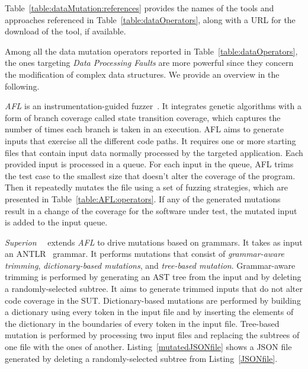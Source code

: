 Table~\ref{table:dataMutation:references} provides the names of the tools and approaches referenced in Table~\ref{table:dataOperators}, along with a URL for the download of the tool, if available.





Among all the data mutation operators reported in Table~\ref{table:dataOperators}, the ones targeting \emph{Data Processing Faults} are more powerful since they concern the modification of complex data structures. %
We provide an overview in the following.




\emph{AFL} is an instrumentation-guided fuzzer~\cite{gutmann2016fuzzing}. It integrates genetic algorithms with a form of branch coverage called state transition coverage,
which captures the number of times each branch is taken in an execution. 
AFL aims to generate inputs that exercise all the different code paths.
It requires one or more starting files that contain input data normally processed by the targeted application. 
Each provided input is processed in a queue. For each input in the queue, AFL trims the test case to the smallest size that doesn't alter the coverage of the program. Then it repeatedly mutates the file using a set of fuzzing strategies, which are presented in Table~\ref{table:AFL:operators}.
If any of the generated mutations result in a change of the coverage for the software under test, the mutated input is added to the input queue.



\emph{Superion}~\Superion~ extends \emph{AFL} to drive mutations based on grammars. It takes as input an ANTLR~\cite{ANTLR} grammar. 
It performs mutations that consist of \emph{grammar-aware trimming}, \emph{dictionary-based mutations}, and \emph{tree-based mutation}.
Grammar-aware trimming is performed by generating an AST tree from the input and by deleting a randomly-selected subtree. 
It aims to generate trimmed inputs that do not alter code coverage in the SUT.
Dictionary-based mutations are performed by building a dictionary using every token in the input file and by inserting the elements of the dictionary in the boundaries of every token in the input file.
Tree-based mutation is performed by processing two input files and replacing the subtrees of one file with the ones of another.
Listing~\ref{mutatedJSONfile} shows a JSON file generated by deleting a randomly-selected subtree from Listing~\ref{JSONfile}.

